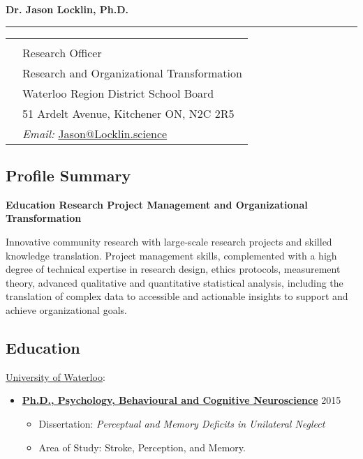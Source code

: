\documentclass[10pt]{article}
\newcommand{\makeheading}[1]%
        {\hspace*{-\marginparsep minus \marginparwidth}%
         \begin{minipage}[t]{\textwidth+\marginparwidth+\marginparsep}%
                {\large \bfseries #1}\\[ -0.15\baselineskip]%
                 \rule{\columnwidth}{1pt}%
         \end{minipage}}
\providecommand{\tightlist}{%
  \setlength{\itemsep}{0pt}\setlength{\parskip}{0pt}}
\begin{document}
\newlength{\rcollength}\setlength{\rcollength}{3in}

\makeheading{Dr. Jason Locklin, Ph.D.}

\begin{tabular}[t]{@{}p{\textwidth-\rcollength}p{\rcollength}}
    & \\
  & Research Officer\\
  & Research and Organizational Transformation \\
  & Waterloo Region District School Board \\
  & 51 Ardelt Avenue, Kitchener ON, N2C 2R5 \\
  & \textit{Email:} \href{mailto:Jason@Locklin.science}{Jason@Locklin.science}\\

\end{tabular}

\subsection{Profile Summary}\label{profile-summary}

\textbf{Education Research Project Management and Organizational
Transformation}

Innovative community research with large-scale research projects and
skilled knowledge translation. Project management skills, complemented
with a high degree of technical expertise in research design, ethics
protocols, measurement theory, advanced qualitative and quantitative
statistical analysis, including the translation of complex data to
accessible and actionable insights to support and achieve organizational
goals.

\subsection{Education}\label{education}

\href{http://www.uwaterloo.ca/}{University of Waterloo}:

\begin{itemize}
\item
  \href{http://psychology.uwaterloo.ca}{\textbf{Ph.D., Psychology,
  Behavioural and Cognitive Neuroscience}} \hfill 2015

  \begin{itemize}
  \tightlist
  \item
    Dissertation: \emph{Perceptual and Memory Deficits in Unilateral
    Neglect}
  \item
    Area of Study: Stroke, Perception, and Memory.
  \end{itemize}
\end{itemize}
\end{document}
